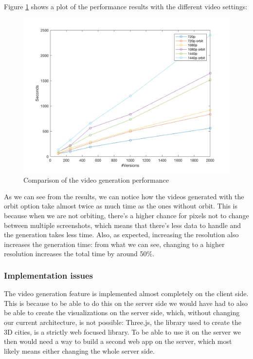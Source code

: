 \documentclass[]{usiinfbachelorproject}
\begin{document}
Figure \ref{fig:plot} shows a plot of the performance results with the different video settings:

\begin{figure} [H]
\centering
\includegraphics[width=1\textwidth]{pictures/figure1.png}
\caption{Comparison of the video generation performance}
\label{fig:plot}
\end{figure}

As we can see from the results, we can notice how the videos generated with the orbit option take almost twice as much time
as the ones without orbit. This is because when we are not orbiting, there's a higher chance for pixels not to change between multiple screenshots, which means that there's less data to handle and the generation takes less time.
Also, as expected, increasing the resolution also increases the generation time: from what we can see, changing to a higher resolution increases the total time by around 50\%.

\subsubsection{Implementation issues} \label{Implementation issues}

The video generation feature is implemented almost completely on the client side. This is because to be able to do this on the server side we would have had to also be able to create the visualizations on the server side, which, without changing our current architecture, is not possible: Three.js, the library used to create the 3D cities, is a strictly web focused library. To be able to use it on the server we then would need a way to build a second web app on the server, which most likely means either changing the whole server side.
\end{document}
